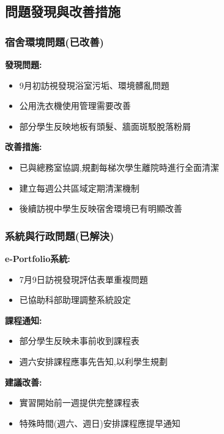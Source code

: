\documentclass[12pt,a4paper]{article}
\begin{document}
\subsection{問題發現與改善措施}

\subsubsection{宿舍環境問題(已改善)}

\textbf{發現問題:}
\begin{itemize}[leftmargin=*]
\item 9月初訪視發現浴室污垢、環境髒亂問題
\item 公用洗衣機使用管理需要改善
\item 部分學生反映地板有頭髮、牆面斑駁脫落粉屑
\end{itemize}

\textbf{改善措施:}
\begin{itemize}[leftmargin=*]
\item 已與總務室協調,規劃每梯次學生離院時進行全面清潔
\item 建立每週公共區域定期清潔機制
\item 後續訪視中學生反映宿舍環境已有明顯改善
\end{itemize}

\subsubsection{系統與行政問題(已解決)}

\textbf{e-Portfolio系統:}
\begin{itemize}[leftmargin=*]
\item 7月9日訪視發現評估表單重複問題
\item 已協助科部助理調整系統設定
\end{itemize}

\textbf{課程通知:}
\begin{itemize}[leftmargin=*]
\item 部分學生反映未事前收到課程表
\item 週六安排課程應事先告知,以利學生規劃
\end{itemize}

\textbf{建議改善:}
\begin{itemize}[leftmargin=*]
\item 實習開始前一週提供完整課程表
\item 特殊時間(週六、週日)安排課程應提早通知
\end{itemize}
\end{document}

